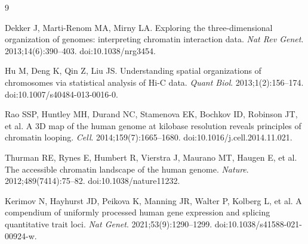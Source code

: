 \documentclass[11pt,a4paper]{article}
\begin{document}
\begin{thebibliography}{9}

Dekker J, Marti-Renom MA, Mirny LA.
Exploring the three-dimensional organization of genomes: interpreting chromatin interaction data.
\textit{Nat Rev Genet}. 2013;14(6):390--403.
doi:10.1038/nrg3454.

Hu M, Deng K, Qin Z, Liu JS.
Understanding spatial organizations of chromosomes via statistical analysis of Hi-C data.
\textit{Quant Biol}. 2013;1(2):156--174.
doi:10.1007/s40484-013-0016-0.

Rao SSP, Huntley MH, Durand NC, Stamenova EK, Bochkov ID, Robinson JT, et al.
A 3D map of the human genome at kilobase resolution reveals principles of chromatin looping.
\textit{Cell}. 2014;159(7):1665--1680.
doi:10.1016/j.cell.2014.11.021.

Thurman RE, Rynes E, Humbert R, Vierstra J, Maurano MT, Haugen E, et al.
The accessible chromatin landscape of the human genome.
\textit{Nature}. 2012;489(7414):75--82.
doi:10.1038/nature11232.

Kerimov N, Hayhurst JD, Peikova K, Manning JR, Walter P, Kolberg L, et al.
A compendium of uniformly processed human gene expression and splicing quantitative trait loci.
\textit{Nat Genet}. 2021;53(9):1290--1299.
doi:10.1038/s41588-021-00924-w.

\end{thebibliography}
\end{document}

